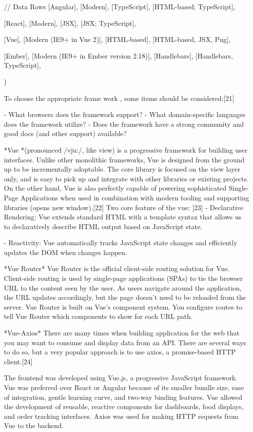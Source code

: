   // Data Rows
  [Angular],
  [Modern],
  [TypeScript],
  [HTML-based; TypeScript],
  

  [React],
  [Modern],
  [JSX],
  [JSX; TypeScript],
  

  [Vue],
  [Modern (IE9+ in Vue 2)],
  [HTML-based],
  [HTML-based, JSX, Pug],
  

  [Ember],
  [Modern (IE9+ in Ember version 2.18)],
  [Handlebars],
  [Handlebars, TypeScript],
  
)

To choose the appropriate frame work , some items should be considered:[21]

    - What browsers does the framework support?
   -  What domain-specific languages does the framework utilize?
  -   Does the framework have a strong community and good docs (and other support) available?

*Vue *(pronounced /vjuː/, like view) is a progressive  framework for building user interfaces. Unlike other monolithic  frameworks, Vue is designed from the ground up to be incrementally adoptable. The core library is focused on the view layer only, and is easy to pick up and integrate with other libraries or existing projects. On the other hand, Vue is also perfectly capable of powering sophisticated Single-Page Applications when used in combination with modern tooling and supporting libraries (opens new window).[22]
Two core feature of the vue: [23]
   - Declarative Rendering: Vue extends standard HTML with a template syntax that allows us to declaratively describe HTML output based on JavaScript state.

   - Reactivity: Vue automatically tracks JavaScript state changes and efficiently updates the DOM when changes happen.

*Vue Router*
Vue Router is the official client-side routing solution for Vue.
Client-side routing is used by single-page applications (SPAs) to tie the browser URL to the content seen by the user. As users navigate around the application, the URL updates accordingly, but the page doesn't need to be reloaded from the server.
Vue Router is built on Vue's component system. You configure routes to tell Vue Router which components to show for each URL path.

*Vue-Axios*
There are many times when building application for the web that you may want to consume and display data from an API. There are several ways to do so, but a very popular approach is to use axios, a promise-based HTTP client.[24]

The frontend was developed using Vue.js, a progressive JavaScript framework. Vue was preferred over React or Angular because of its smaller bundle size, ease of integration, gentle learning curve, and two-way binding features. Vue allowed the development of reusable, reactive components for dashboards, food displays, and order tracking interfaces. Axios was used for making HTTP requests from Vue to the backend.


